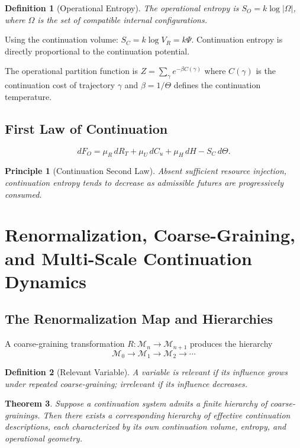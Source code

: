 \documentclass[12pt,a4paper]{article}
\newtheorem{theorem}{Theorem}[section]
\newtheorem{definition}[theorem]{Definition}
\newtheorem*{principle}{Principle}
\newcommand{\M}{\mathcal{M}}
\begin{document}
\begin{definition}[Operational Entropy]
The \emph{operational entropy} is $S_O = k\log|\Omega|$, where $\Omega$ is the set of compatible internal configurations.
\end{definition}

Using the continuation volume: $S_C = k\log V_R = k\Psi$. Continuation entropy is directly proportional to the continuation potential.

The operational partition function is $Z = \sum_\gamma e^{-\beta C(\gamma)}$ where $C(\gamma)$ is the continuation cost of trajectory $\gamma$ and $\beta = 1/\Theta$ defines the continuation temperature.

\subsection{First Law of Continuation}

\[
dF_O = \mu_R\, dR_T + \mu_U\, dC_u + \mu_H\, dH - S_C\, d\Theta.
\]

\begin{principle}[Continuation Second Law]
Absent sufficient resource injection, continuation entropy tends to decrease as admissible futures are progressively consumed.
\end{principle}

\section{Renormalization, Coarse-Graining, and Multi-Scale Continuation Dynamics}

\subsection{The Renormalization Map and Hierarchies}

A coarse-graining transformation $R : \M_n \to \M_{n+1}$ produces the hierarchy
\[
\M_0 \to \M_1 \to \M_2 \to \cdots
\]

\begin{definition}[Relevant Variable]
A variable is \emph{relevant} if its influence grows under repeated coarse-graining; \emph{irrelevant} if its influence decreases.
\end{definition}

\begin{theorem}
Suppose a continuation system admits a finite hierarchy of coarse-grainings. Then there exists a corresponding hierarchy of effective continuation descriptions, each characterized by its own continuation volume, entropy, and operational geometry.
\end{theorem}
\end{document}
